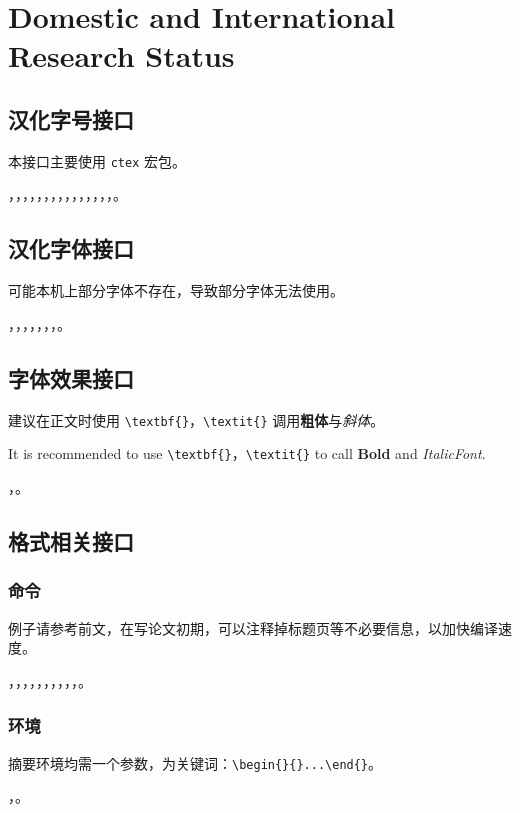 \section{Domestic and International Research Status}
\lipsum[1]

\subsection{汉化字号接口}
本接口主要使用 \texttt{ctex} 宏包。

，，，，，，，，，，，，，，，。


\subsection{汉化字体接口}
可能本机上部分字体不存在，导致部分字体无法使用。

，，，，，，，。


\subsection{字体效果接口}

建议在正文时使用 \verb|\textbf{}|，\verb|\textit{}| 调用\textbf{粗体}与\textit{斜体}。

It is recommended to use \verb|\textbf{}|，\verb|\textit{}| to call \textbf{Bold} and \textit{ItalicFont}.

，。


\subsection{格式相关接口}
\subsubsection{命令}
例子请参考前文，在写论文初期，可以注释掉标题页等不必要信息，以加快编译速度。

，，，，，，，，，，。

\subsubsection{环境}
摘要环境均需一个参数，为关键词：\verb|\begin{}{}...\end{}|。

，。
